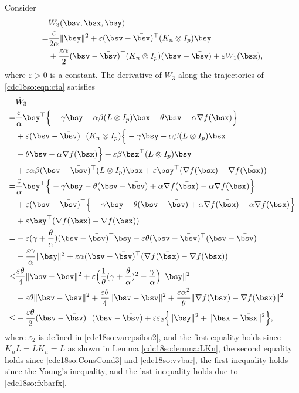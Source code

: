 \documentclass[letterpaper, 10 pt, conference]{ieeeconf}  %
\begin{document}
Consider
\begin{align}\label{cdc18so:w3}
&W_3(\bsv,\bsx,\bsy)\nonumber\\
=&\frac{\varepsilon}{2\alpha}\|\bsy\|^2+\varepsilon(\bsv-\bar{\bsv})^\top (K_n \otimes I_p)\bsy\nonumber\\
&+\frac{\varepsilon\alpha}{2}(\bsv-\bar{\bsv})^\top (K_n \otimes I_p)(\bsv-\bar{\bsv})+\varepsilon W_1(\bsx),
\end{align}
where $\varepsilon>0$ is a constant.
The derivative of $W_3$ along the trajectories of \eqref{cdc18so:eqn:cta} satisfies
\begin{align}\label{cdc18so:w3dot}
&\dot{W}_3\nonumber\\
=&\frac{\varepsilon}{\alpha}\bsy^\top\Big\{-\gamma \bsy-\alpha\beta(L\otimes I_p)\bsx- \theta \bsv- \alpha \nabla f(\bsx)\Big\}\nonumber\\
&+\varepsilon(\bsv-\bar{\bsv})^\top (K_n \otimes I_p) \Big\{- \gamma \bsy-\alpha\beta (L \otimes I_p)\bsx\nonumber\\
&- \theta \bsv- \alpha \nabla f(\bsx)\Big\}+\varepsilon \beta \bsx^\top(L \otimes I_p)\bsy\nonumber\\
&+\varepsilon\alpha\beta(\bsv-\bar{\bsv})^\top (L \otimes I_p)\bsx+\varepsilon \bsy^\top(\nabla f(\bsx)-\nabla  f(\bar{\bsx}))\nonumber\\
=&\frac{\varepsilon}{\alpha}\bsy^\top\Big\{-\gamma \bsy- \theta (\bsv-\bar{\bsv})+\alpha \nabla f(\bar{\bsx})- \alpha \nabla f(\bsx)\Big\}\nonumber\\
&+\varepsilon(\bsv-\bar{\bsv})^\top \Big\{- \gamma \bsy-\theta (\bsv-\bar{\bsv})+\alpha \nabla f(\bar{\bsx})- \alpha \nabla f(\bsx)\Big\}\nonumber\\
&+\varepsilon \bsy^\top(\nabla f(\bsx)-\nabla  f(\bar{\bsx}))\nonumber\\
=&-\varepsilon(\gamma+\frac{\theta}{\alpha})(\bsv-\bar{\bsv})^\top \bsy-\varepsilon\theta (\bsv-\bar{\bsv})^\top(\bsv-\bar{\bsv})\nonumber\\
&-\frac{\varepsilon\gamma}{\alpha}\|\bsy\|^2+\varepsilon\alpha (\bsv-\bar{\bsv})^\top (\nabla f(\bar{\bsx})-\nabla f(\bsx))\nonumber\\
\le&\frac{\varepsilon\theta }{4}\|\bsv-\bar{\bsv}\|^2+\varepsilon\Big(\frac{1}{\theta}(\gamma+\frac{\theta}{\alpha})^2
-\frac{\gamma}{\alpha}\Big)\|\bsy\|^2\nonumber\\
&-\varepsilon\theta\|\bsv-\bar{\bsv}\|^2
+\frac{\varepsilon\theta }{4}\|\bsv-\bar{\bsv}\|^2+\frac{\varepsilon\alpha^2}{\theta }\|\nabla f(\bar{\bsx})-\nabla f(\bsx)\|^2\nonumber\\
\le&-\frac{\varepsilon\theta }{2}(\bsv-\bar{\bsv})^\top(\bsv-\bar{\bsv})+\varepsilon\varepsilon_2\Big\{\|\bsy\|^2
+\|\bsx-\bar{\bsx}\|^2\Big\},
\end{align}
where $\varepsilon_2$ is defined in \eqref{cdc18so:varepsilon2}, and  the first equality holds since $K_nL=LK_n=L$  as shown in Lemma \ref{cdc18so:lemma:LKn}, the second equality holds since \eqref{cdc18so:ConsCond3}  and \eqref{cdc18so:vvbar}, the first inequality holds since the Young's inequality, and the last inequality holds due to \eqref{cdc18so:fxbarfx}.
\end{document}
